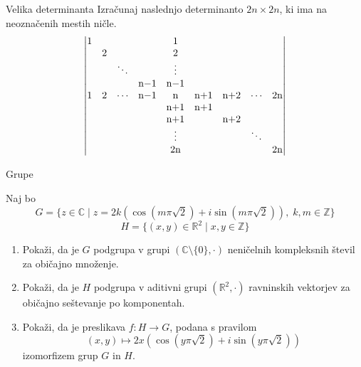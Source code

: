\begin{frame}{Velika determinanta}
	Izračunaj naslednjo determinanto $2n \times 2n$, ki ima na neoznačenih mestih ničle.
	\begin{equation*}
		\left|
			\begin{matrix}
				1 & & & & 1 & & & & \\
				  & 2 & & & 2 & & & & \\
				  &  & \ddots & & \vdots & & & & \\
				  &  & & $n$-1 & $n$-1 & & & & \\
				 1 & 2 & \cdots& $n$-1 & $n$ & $n$+1 & $n$+2 & \cdots & 2$n$ \\
				 &  & &  & $n$+1 & $n$+1& & & \\
				 &  & &  & $n$+1 & & $n$+2& & \\
				 &  &  & & \vdots & & & \ddots& \\
				 &  &  & & 2$n$ & & & & 2$n$\\
				 

			\end{matrix}
		\right|
	\end{equation*}
\end{frame}

\begin{frame}{Grupe}
	
	Naj bo \[
G = \{ z \in \mathbb{C} \mid z = 2k (\cos(m\pi \sqrt{2}) + i\sin(m\pi \sqrt{2})), \; k,m \in \mathbb{Z} \}
\]
\[
H = \{ (x,y) \in \mathbb{R}^2 \mid x, y \in \mathbb{Z} \}
\]
	
	\begin{enumerate}
		\item
			Pokaži, da je $G$ podgrupa v grupi $(\mathbb{C} \setminus \{0\}, \cdot)$
			neničelnih kompleksnih števil za običajno množenje.
		\item
			Pokaži, da je $H$ podgrupa v aditivni grupi $(\mathbb{R}^2, \cdot)$
			ravninskih vektorjev za običajno seštevanje po komponentah.
		\item
			Pokaži, da je preslikava $f:H\to G$, podana s pravilom
			\[
(x, y) \mapsto 2x \left( \cos(y\pi \sqrt{2}) + i \sin(y\pi \sqrt{2}) \right)
\]
			izomorfizem grup $G$ in $H$.
	\end{enumerate}
\end{frame}
